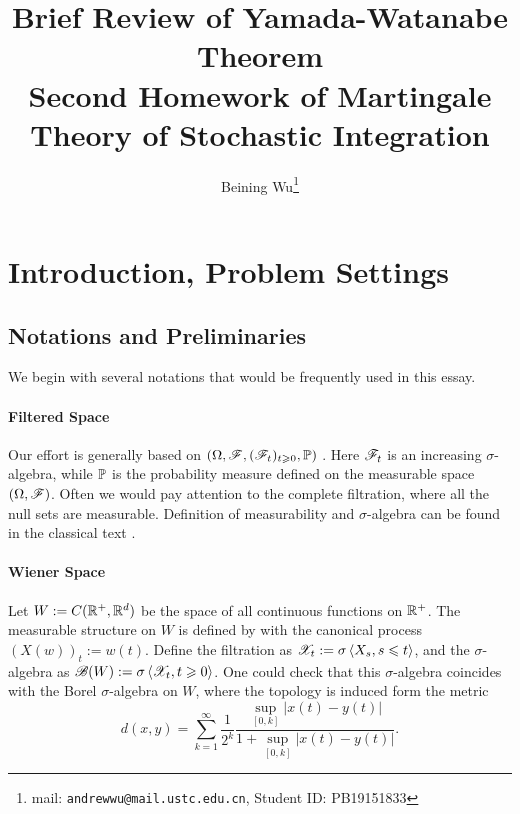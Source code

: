 \documentclass[8pt,onesided]{article}
\begin{document}
{
\title{\mc  Brief Review of Yamada-Watanabe Theorem\vspace*{.5em}\\  \large Second Homework of Martingale Theory of Stochastic Integration }
\author{Beining Wu\footnote{mail: \texttt{andrewwu@mail.ustc.edu.cn}, Student ID: PB19151833}}
\maketitle
}


\section{Introduction, Problem Settings}

\subsection{Notations and Preliminaries}

We begin with several notations that would be frequently used in this essay. 

\paragraph{Filtered Space} Our effort is generally based on $(\Omega, \mathscr{F},(\mathscr{F}_t)_{t\geqslant 0}, \mathbb{P})$ . Here $\mathscr{F}_t$ is an increasing $\sigma$-algebra, while $\mathbb{P}$ is the probability measure defined on the measurable space $(\Omega,\mathscr{F})$. Often we would pay attention to the complete filtration, where all the null sets are measurable. Definition of measurability and $\sigma$-algebra can be found in the classical text \cite{durrett2019probability}.

\paragraph{Wiener Space} Let $W:=C(\mathbb{R}^+,\mathbb{R}^d)$ be the space of all continuous functions on $\mathbb{R}^+$. The measurable structure on $W$ is defined by with the canonical process $(X(w))_t:=w(t)$. Define the filtration as $\mathscr{X}_t:=\sigma \left\langle  X_s, s\leqslant t\right\rangle$, and the $\sigma$-algebra as $\mathscr{B}(W):=\sigma \left\langle \mathscr{X}_t,t\geqslant 0\right\rangle$. One could check that this $\sigma$-algebra coincides with the Borel $\sigma$-algebra on $W$, where the topology is induced form the metric
\begin{equation*}
    d(x,y)=\sum_{k=1}^{\infty} \frac{1}{2^k} \frac{\sup_{[0,k]} |x(t)-y(t)|}{1+\sup_{[0,k]} |x(t)-y(t)|}.
\end{equation*}
\end{document}
